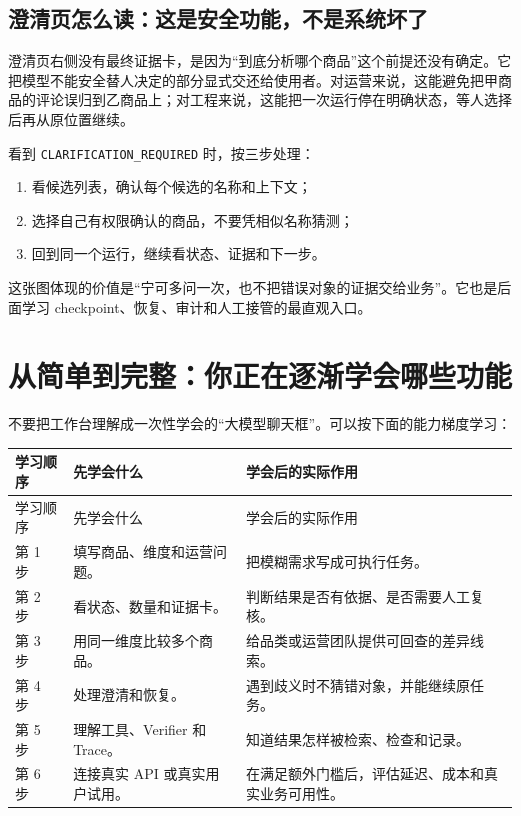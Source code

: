 \subsection*{澄清页怎么读：这是安全功能，不是系统坏了}

澄清页右侧没有最终证据卡，是因为“到底分析哪个商品”这个前提还没有确定。它把模型不能安全替人决定的部分显式交还给使用者。对运营来说，这能避免把甲商品的评论误归到乙商品上；对工程来说，这能把一次运行停在明确状态，等人选择后再从原位置继续。

看到 \texttt{CLARIFICATION\_REQUIRED} 时，按三步处理：

\begin{enumerate}
  \item 看候选列表，确认每个候选的名称和上下文；
  \item 选择自己有权限确认的商品，不要凭相似名称猜测；
  \item 回到同一个运行，继续看状态、证据和下一步。
\end{enumerate}

这张图体现的价值是“宁可多问一次，也不把错误对象的证据交给业务”。它也是后面学习 checkpoint、恢复、审计和人工接管的最直观入口。

\section{从简单到完整：你正在逐渐学会哪些功能}

不要把工作台理解成一次性学会的“大模型聊天框”。可以按下面的能力梯度学习：

\begin{longtable}{>{\raggedright\arraybackslash}p{}>{\raggedright\arraybackslash}p{}>{\raggedright\arraybackslash}p{}}
\toprule
学习顺序 & 先学会什么 & 学会后的实际作用 \\
\midrule
\endfirsthead
\toprule
学习顺序 & 先学会什么 & 学会后的实际作用 \\
\midrule
\endhead
第 1 步 & 填写商品、维度和运营问题。 & 把模糊需求写成可执行任务。 \\
第 2 步 & 看状态、数量和证据卡。 & 判断结果是否有依据、是否需要人工复核。 \\
第 3 步 & 用同一维度比较多个商品。 & 给品类或运营团队提供可回查的差异线索。 \\
第 4 步 & 处理澄清和恢复。 & 遇到歧义时不猜错对象，并能继续原任务。 \\
第 5 步 & 理解工具、Verifier 和 Trace。 & 知道结果怎样被检索、检查和记录。 \\
第 6 步 & 连接真实 API 或真实用户试用。 & 在满足额外门槛后，评估延迟、成本和真实业务可用性。 \\
\bottomrule
\end{longtable}


